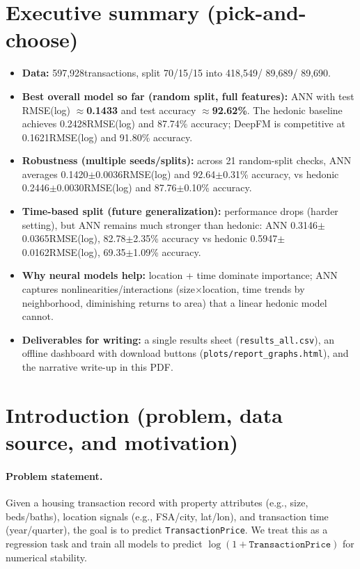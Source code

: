 \documentclass[11pt]{article}
\newcommand{\NTotal}{597{,}928}
\newcommand{\NTrain}{418{,}549}
\newcommand{\NVal}{89{,}689}
\newcommand{\NTest}{89{,}690}
\newcommand{\AnnRandRmseMean}{0.1420}
\newcommand{\AnnRandRmseStd}{0.0036}
\newcommand{\AnnRandAccMean}{92.64}
\newcommand{\AnnRandAccStd}{0.31}
\newcommand{\HedRandRmseMean}{0.2446}
\newcommand{\HedRandRmseStd}{0.0030}
\newcommand{\HedRandAccMean}{87.76}
\newcommand{\HedRandAccStd}{0.10}
\newcommand{\AnnTimeRmseMean}{0.3146}
\newcommand{\AnnTimeRmseStd}{0.0365}
\newcommand{\AnnTimeAccMean}{82.78}
\newcommand{\AnnTimeAccStd}{2.35}
\newcommand{\HedTimeRmseMean}{0.5947}
\newcommand{\HedTimeRmseStd}{0.0162}
\newcommand{\HedTimeAccMean}{69.35}
\newcommand{\HedTimeAccStd}{1.09}
\newcommand{\BestAnnTestRmse}{0.1433}
\newcommand{\BestAnnTestAcc}{92.62}
\newcommand{\BestDeepfmTestRmse}{0.1621}
\newcommand{\BestDeepfmTestAcc}{91.80}
\newcommand{\BestHedTestRmse}{0.2428}
\newcommand{\BestHedTestAcc}{87.74}
\begin{document}
\section{Executive summary (pick-and-choose)}
\begin{itemize}[leftmargin=*]
  \item \textbf{Data:} \NTotal transactions, split 70/15/15 into \NTrain / \NVal / \NTest.
  \item \textbf{Best overall model so far (random split, full features):} ANN with test RMSE(log) \(\approx\)\textbf{\BestAnnTestRmse} and test accuracy \(\approx\)\textbf{\BestAnnTestAcc\%}. The hedonic baseline achieves \BestHedTestRmse RMSE(log) and \BestHedTestAcc\% accuracy; DeepFM is competitive at \BestDeepfmTestRmse RMSE(log) and \BestDeepfmTestAcc\% accuracy.
  \item \textbf{Robustness (multiple seeds/splits):} across 21 random-split checks, ANN averages \AnnRandRmseMean\(\pm\)\AnnRandRmseStd RMSE(log) and \AnnRandAccMean\(\pm\)\AnnRandAccStd\% accuracy, vs hedonic \HedRandRmseMean\(\pm\)\HedRandRmseStd RMSE(log) and \HedRandAccMean\(\pm\)\HedRandAccStd\% accuracy.
  \item \textbf{Time-based split (future generalization):} performance drops (harder setting), but ANN remains much stronger than hedonic: ANN \AnnTimeRmseMean\(\pm\)\AnnTimeRmseStd RMSE(log), \AnnTimeAccMean\(\pm\)\AnnTimeAccStd\% accuracy vs hedonic \HedTimeRmseMean\(\pm\)\HedTimeRmseStd RMSE(log), \HedTimeAccMean\(\pm\)\HedTimeAccStd\% accuracy.
  \item \textbf{Why neural models help:} location + time dominate importance; ANN captures nonlinearities/interactions (size\(\times\)location, time trends by neighborhood, diminishing returns to area) that a linear hedonic model cannot.
  \item \textbf{Deliverables for writing:} a single results sheet (\texttt{results\_all.csv}), an offline dashboard with download buttons (\texttt{plots/report\_graphs.html}), and the narrative write-up in this PDF.
\end{itemize}

\section{Introduction (problem, data source, and motivation)}
\paragraph{Problem statement.}
Given a housing transaction record with property attributes (e.g., size, beds/baths), location signals (e.g., FSA/city, lat/lon), and transaction time (year/quarter), the goal is to predict \texttt{TransactionPrice}. We treat this as a regression task and train all models to predict \(\log(1+\texttt{TransactionPrice})\) for numerical stability.
\end{document}
